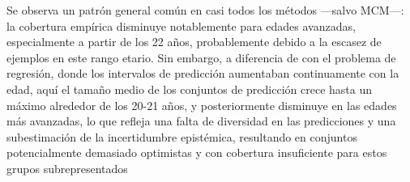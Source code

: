 

    


Se observa un patrón general común en casi todos los métodos ---salvo MCM---: la cobertura empírica disminuye notablemente para edades avanzadas, especialmente a partir de los 22 años, probablemente debido a la escasez de ejemplos en este rango etario. Sin embargo, a diferencia de con el problema de regresión, donde los intervalos de predicción aumentaban continuamente con la edad, aquí el tamaño medio de los conjuntos de predicción crece hasta un máximo alrededor de los 20-21 años, y posteriormente disminuye en las edades más avanzadas, lo que refleja una falta de diversidad en las predicciones y una subestimación de la incertidumbre epistémica, resultando en conjuntos potencialmente demasiado optimistas y con cobertura insuficiente para estos grupos subrepresentados

